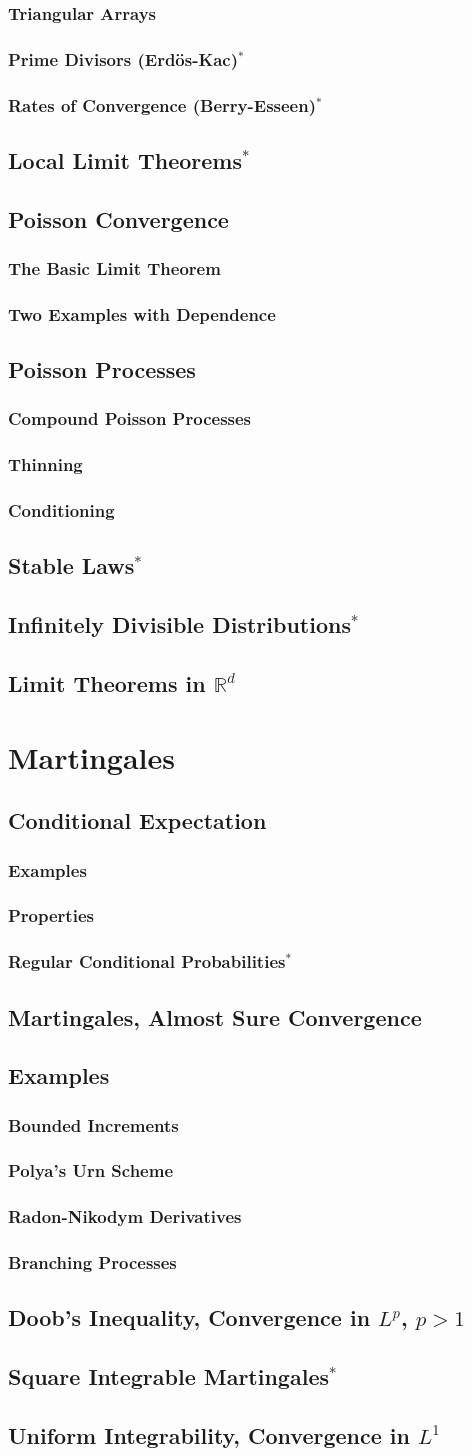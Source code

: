 \documentclass[11pt]{article}
\newcommand{\RR}{\mathbb{R}}
\newcommand{\stubsection}[1]{\section{#1}\mbox{}\par}
\newcommand{\stubsubsection}[1]{\subsection{#1}\mbox{}\par}
\newcommand{\stubsubsubsection}[1]{\subsubsection{#1}\mbox{}\par}
\begin{document}
\stubsubsubsection{Triangular Arrays}

\stubsubsubsection{Prime Divisors (Erd\"os-Kac)\texorpdfstring{$^\ast$}{*}}

\stubsubsubsection{Rates of Convergence (Berry-Esseen)\texorpdfstring{$^\ast$}{*}}

\stubsubsection{Local Limit Theorems\texorpdfstring{$^\ast$}{*}}

\stubsubsection{Poisson Convergence}

\stubsubsubsection{The Basic Limit Theorem}

\stubsubsubsection{Two Examples with Dependence}

\stubsubsection{Poisson Processes}

\stubsubsubsection{Compound Poisson Processes}

\stubsubsubsection{Thinning}

\stubsubsubsection{Conditioning}

\stubsubsection{Stable Laws\texorpdfstring{$^\ast$}{*}}

\stubsubsection{Infinitely Divisible Distributions\texorpdfstring{$^\ast$}{*}}

\stubsubsection{\texorpdfstring{Limit Theorems in $\RR^d$}{Limit Theorems in R\^{}d}}

\stubsection{Martingales}

\stubsubsection{Conditional Expectation}

\stubsubsubsection{Examples}

\stubsubsubsection{Properties}

\stubsubsubsection{Regular Conditional Probabilities\texorpdfstring{$^\ast$}{*}}

\stubsubsection{Martingales, Almost Sure Convergence}

\stubsubsection{Examples}

\stubsubsubsection{Bounded Increments}

\stubsubsubsection{Polya's Urn Scheme}

\stubsubsubsection{Radon-Nikodym Derivatives}

\stubsubsubsection{Branching Processes}

\stubsubsection{\texorpdfstring{Doob's Inequality, Convergence in $L^p$, $p > 1$}{Doob's Inequality, Convergence in Lp, p > 1}}

\stubsubsection{Square Integrable Martingales\texorpdfstring{$^\ast$}{*}}

\stubsubsection{\texorpdfstring{Uniform Integrability, Convergence in $L^1$}{Uniform Integrability, Convergence in L1}}
\end{document}
